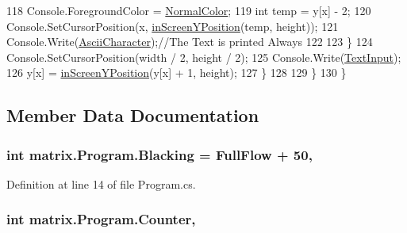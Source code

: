 \begin{DoxyCode}
118                             Console.ForegroundColor = \hyperlink{classmatrix_1_1_program_ab208e57b1469c5728605ac04b0eae86c}{NormalColor};
119                         \textcolor{keywordtype}{int} temp = y[x] - 2;
120                         Console.SetCursorPosition(x, \hyperlink{classmatrix_1_1_program_ae800bb3943994a4c6d5595fcb01370c5}{inScreenYPosition}(temp, height));
121                         Console.Write(\hyperlink{classmatrix_1_1_program_ae4f0df2b9f302e657820ea236f831664}{AsciiCharacter});\textcolor{comment}{//The Text is printed Always}
122 
123                     \}
124                     Console.SetCursorPosition(width / 2, height / 2);
125                     Console.Write(\hyperlink{classmatrix_1_1_program_a4261f7dfcf193d03c22afd544ac71010}{TextInput});
126                     y[x] = \hyperlink{classmatrix_1_1_program_ae800bb3943994a4c6d5595fcb01370c5}{inScreenYPosition}(y[x] + 1, height);
127                 \}
128 
129             \}
130         \}
\end{DoxyCode}


\subsection{Member Data Documentation}
\hypertarget{classmatrix_1_1_program_a48b4255583a63007038c6c61bd50672b}{
\subsubsection[{Blacking}]{\setlength{\rightskip}{0pt plus 5cm}int matrix.\-Program.\-Blacking = {\bf Full\-Flow} + 50\hspace{0.3cm}{\ttfamily [static]}, {\ttfamily [private]}}}\label{classmatrix_1_1_program_a48b4255583a63007038c6c61bd50672b}


Definition at line 14 of file Program.\-cs.

\hypertarget{classmatrix_1_1_program_a7ebfe2b7ace6afb02108a7d38abb6f1b}{
\subsubsection[{Counter}]{\setlength{\rightskip}{0pt plus 5cm}int matrix.\-Program.\-Counter\hspace{0.3cm}{\ttfamily [static]}, {\ttfamily [private]}}}\label{classmatrix_1_1_program_a7ebfe2b7ace6afb02108a7d38abb6f1b}



